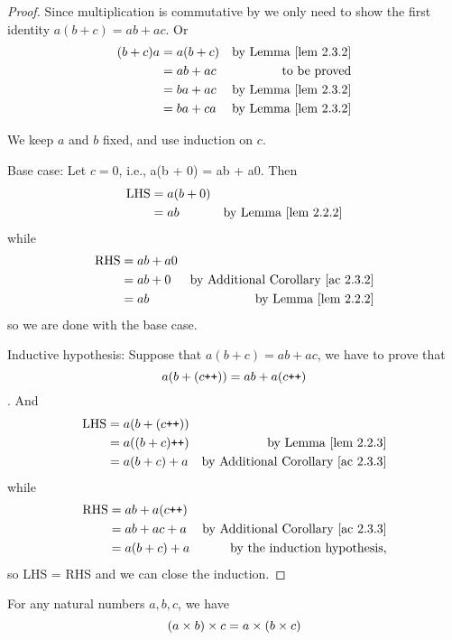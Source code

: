 \begin{proof}
Since multiplication is commutative by  we only need to show the first identity \(a(b + c)= ab + ac\). Or
\begin{align*}
    (b + c)a & = a(b + c) & \text{by \LEM{2.3.2}} \\
             & = ab + ac  & \text{to be proved} \\
             & = ba + ac  & \text{by \LEM{2.3.2}} \\
             & = ba + ca  & \text{by \LEM{2.3.2}}
\end{align*}

We keep \(a\) and \(b\) fixed, and use induction on \(c\).

Base case: Let \(c = 0\), i.e., a(b + 0) = ab + a0. Then
\begin{align*}
    \text{LHS} & = a(b + 0) \\
        & = ab & \text{by \LEM{2.2.2}}
\end{align*}
while
\begin{align*}
    \text{RHS} & = ab + a0 \\
        & = ab + 0 & \text{by \AC{2.3.2}} \\
        & = ab & \text{by \LEM{2.2.2}}
\end{align*}
so we are done with the base case.

Inductive hypothesis: Suppose that \(a(b + c) = ab + ac\), we have to prove that
\[a(b + (c\texttt{++})) = ab + a(c\texttt{++})\].
And
\begin{align*}
    \text{LHS} & = a(b + (c\INC)) \\
               & = a((b + c)\INC) & \text{by \LEM{2.2.3}}\\
               & = a(b + c) + a & \text{by \AC{2.3.3}} \\
\end{align*}
while
\begin{align*}
    \text{RHS} & = ab + a(c\INC) \\
               & = ab + ac + a & \text{by \AC{2.3.3}} \\ 
               & = a(b + c)+ a & \text{by the induction hypothesis,} 
\end{align*}
so LHS = RHS and we can close the induction.
\end{proof}

\begin{proposition} \label{prop 2.3.5}
For any natural numbers \(a, b, c\), we have
\[(a \times b) \times c = a \times (b \times c)\]
\end{proposition}

